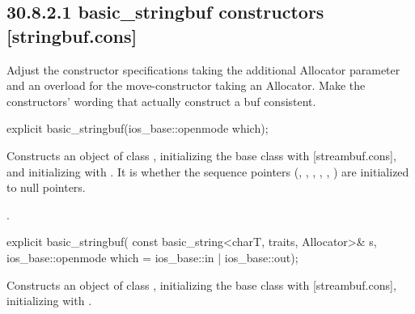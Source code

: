 \documentclass[ebook,11pt,article]{memoir}
\renewcommand{\iref}[1]{[#1]}
\begin{document}



\subsection{30.8.2.1 basic\_stringbuf constructors [stringbuf.cons]}
\begin{em}
Adjust the constructor specifications taking the additional Allocator parameter and an overload for the move-constructor taking an Allocator. Make the constructors' wording that actually construct a buf consistent.
\end{em}

\begin{itemdecl}
explicit basic_stringbuf(ios_base::openmode which);
\end{itemdecl}

\begin{itemdescr}
\pnum
\effects
Constructs an object of class
,
initializing the base class with
\iref{streambuf.cons}, and initializing
with .
It is
whether the sequence pointers
(, , ,
, , )
are initialized to null pointers.

\pnum
\ensures
{}.
\end{itemdescr}

\begin{itemdecl}
explicit basic_stringbuf(
  const basic_string<charT, traits, Allocator>& s,
  ios_base::openmode which = ios_base::in | ios_base::out);
\end{itemdecl}

\begin{itemdescr}
\pnum
\effects
Constructs an object of class
,
initializing the base class with
\iref{streambuf.cons},  initializing
with  .
\end{itemdescr}
\end{document}
